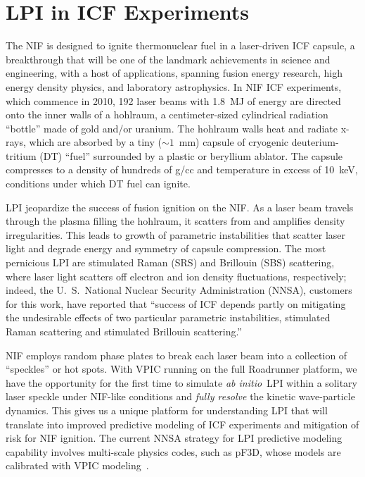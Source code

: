 \documentclass[journal,twoside]{IEEEtran}
\newcommand{\abinitio} {\textit{ab initio}}
\begin{document}
\section{LPI in ICF Experiments}

The NIF is designed to ignite thermonuclear fuel in a laser-driven ICF
capsule, a breakthrough that will be one of the landmark achievements
in science and engineering, with a host of applications, spanning
fusion energy research, high energy density physics, and laboratory
astrophysics.  In NIF ICF experiments, which commence in 2010, 192
laser beams with 1.8~MJ of energy are directed onto the inner walls of
a hohlraum, a centimeter-sized cylindrical radiation ``bottle'' made
of gold and/or uranium.  The hohlraum walls heat and radiate x-rays,
which are absorbed by a tiny ($\sim 1$~mm) capsule of cryogenic
deuterium-tritium (DT) ``fuel'' surrounded by a plastic or beryllium
ablator.  The capsule compresses to a density of hundreds of g/cc and
temperature in excess of 10~keV, conditions under which DT fuel can
ignite.

LPI jeopardize the success of fusion ignition on the NIF.  As a laser
beam travels through the plasma filling the hohlraum, it scatters from
and amplifies density irregularities.  This leads to growth of
parametric instabilities that scatter laser light and degrade energy
and symmetry of capsule compression.  The most pernicious LPI are
stimulated Raman (SRS) and Brillouin (SBS) scattering, where laser
light scatters off electron and ion density fluctuations,
respectively; indeed, the U.~S.~National Nuclear Security
Administration (NNSA), customers for this work, have reported that
``success of ICF depends partly on mitigating the undesirable effects of
two particular parametric instabilities, stimulated Raman scattering
and stimulated Brillouin scattering.''~\cite{LLNL_LPI_webpage}

NIF employs random phase plates to break each laser beam into a
collection of ``speckles'' or hot spots.  
With VPIC running on the full Roadrunner platform, we have the
opportunity for the first time to simulate \abinitio\ LPI within a
solitary laser speckle under NIF-like conditions and \textit{fully
resolve} the kinetic wave-particle dynamics.  This gives us a unique
platform for understanding LPI that will translate into improved
predictive modeling of ICF experiments and mitigation of risk for NIF
ignition.  The current NNSA strategy for LPI predictive modeling
capability involves multi-scale physics codes, such as pF3D, whose
models are calibrated with VPIC
modeling~\cite{Glenzer_Nature_Physics_2007,
Labaune_Nature_Physics_2007}.
\end{document}
